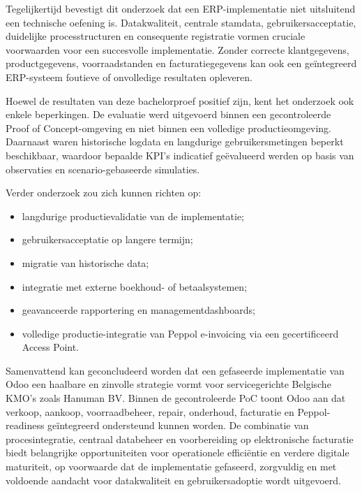 Tegelijkertijd bevestigt dit onderzoek dat een ERP-implementatie niet uitsluitend een technische oefening is. Datakwaliteit, centrale stamdata, gebruikersacceptatie, duidelijke processtructuren en consequente registratie vormen cruciale voorwaarden voor een succesvolle implementatie. Zonder correcte klantgegevens, productgegevens, voorraadstanden en facturatiegegevens kan ook een geïntegreerd ERP-systeem foutieve of onvolledige resultaten opleveren.

Hoewel de resultaten van deze bachelorproef positief zijn, kent het onderzoek ook enkele beperkingen. De evaluatie werd uitgevoerd binnen een gecontroleerde Proof of Concept-omgeving en niet binnen een volledige productieomgeving. Daarnaast waren historische logdata en langdurige gebruikersmetingen beperkt beschikbaar, waardoor bepaalde KPI's indicatief geëvalueerd werden op basis van observaties en scenario-gebaseerde simulaties.

Verder onderzoek zou zich kunnen richten op:
\begin{itemize}
    \item langdurige productievalidatie van de implementatie;
    \item gebruikersacceptatie op langere termijn;
    \item migratie van historische data;
    \item integratie met externe boekhoud- of betaalsystemen;
    \item geavanceerde rapportering en managementdashboards;
    \item volledige productie-integratie van Peppol e-invoicing via een gecertificeerd Access Point.
\end{itemize}

Samenvattend kan geconcludeerd worden dat een gefaseerde implementatie van Odoo een haalbare en zinvolle strategie vormt voor servicegerichte Belgische KMO's zoals Hanuman BV. Binnen de gecontroleerde PoC toont Odoo aan dat verkoop, aankoop, voorraadbeheer, repair, onderhoud, facturatie en Peppol-readiness geïntegreerd ondersteund kunnen worden. De combinatie van procesintegratie, centraal databeheer en voorbereiding op elektronische facturatie biedt belangrijke opportuniteiten voor operationele efficiëntie en verdere digitale maturiteit, op voorwaarde dat de implementatie gefaseerd, zorgvuldig en met voldoende aandacht voor datakwaliteit en gebruikersadoptie wordt uitgevoerd.